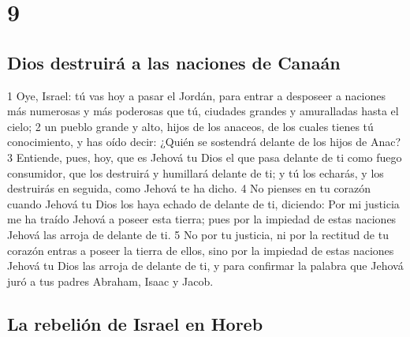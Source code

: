 \chapter{9}

\section{Dios destruirá a las naciones de Canaán}

1 Oye, Israel: tú vas hoy a pasar el Jordán, para entrar a desposeer a naciones más numerosas y más poderosas que tú, ciudades grandes y amuralladas hasta el cielo;
2 un pueblo grande y alto, hijos de los anaceos, de los cuales tienes tú conocimiento, y has oído decir: ¿Quién se sostendrá delante de los hijos de Anac?
3 Entiende, pues, hoy, que es Jehová tu Dios el que pasa delante de ti como fuego consumidor, que los destruirá y humillará delante de ti; y tú los echarás, y los destruirás en seguida, como Jehová te ha dicho.
4 No pienses en tu corazón cuando Jehová tu Dios los haya echado de delante de ti, diciendo: Por mi justicia me ha traído Jehová a poseer esta tierra; pues por la impiedad de estas naciones Jehová las arroja de delante de ti.
5 No por tu justicia, ni por la rectitud de tu corazón entras a poseer la tierra de ellos, sino por la impiedad de estas naciones Jehová tu Dios las arroja de delante de ti, y para confirmar la palabra que Jehová juró a tus padres Abraham, Isaac y Jacob.

\section{La rebelión de Israel en Horeb }


